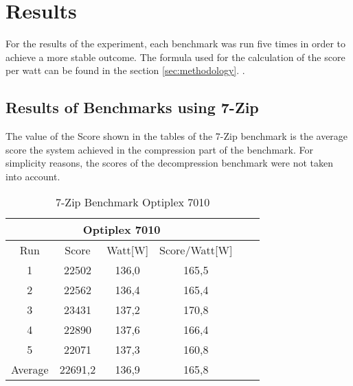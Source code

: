 \section{Results}
For the results of the experiment, each benchmark was run five times in order to achieve a more stable outcome.
The formula used for the calculation of the score per watt
can be found in the section 
\ref{sec:methodology}. .


\subsection{Results of Benchmarks using 7-Zip}
The value of the Score shown in the tables of the 7-Zip benchmark is the average score the system achieved in the compression part of the benchmark.
For simplicity reasons, the scores of the decompression benchmark were not taken into account.

\begin{table} [h!]
\centering
\caption{7-Zip Benchmark Optiplex 7010}
\label{tab:7zipBenchmarkOptiplex}
\begin{tabular}{c c c c c c}
\hline
 \multicolumn{4}{|c|}{Optiplex 7010} \\   \hline
Run & Score & Watt[W] & Score/Watt[W]\\                    \hline
1 & 22502 & 136,0 &  165,5\\    
2 & 22562 & 136,4 &  165,4\\       
3 & 23431 & 137,2 &  170,8\\       
4 & 22890 & 137,6 &  166,4\\    
5 & 22071 & 137,3 &  160,8\\                                \hline
Average & 22691,2 & 136,9 & 165,8\\                      \hline
\end{tabular}
\end{table}


